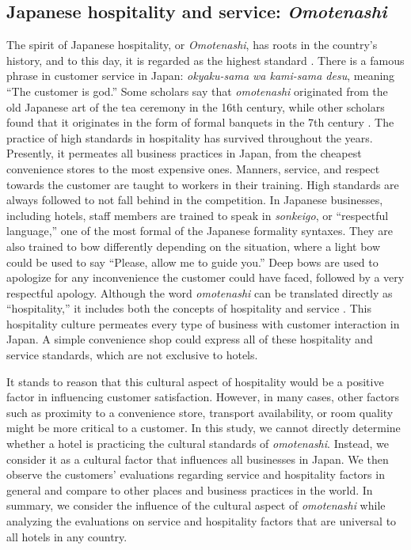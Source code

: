 \documentclass[smallextended,natbib]{svjour3}       %
\begin{document}
  \subsection{Japanese hospitality and service: \textit{Omotenashi}}\label{theory_omotenashi}

    The spirit of Japanese hospitality, or \textit{Omotenashi}, has roots in the country’s history, and to this day, it is regarded as the highest standard \cite[][]{ikeda2013omotenashi, al2015characteristics}. There is a famous phrase in customer service in Japan: \textit{okyaku-sama wa kami-sama desu}, meaning ``The customer is god.'' Some scholars say that \textit{omotenashi} originated from the old Japanese art of the tea ceremony in the 16th century, while other scholars found that it originates in the form of formal banquets in the 7th century \cite[][]{aishima2015origin}. The practice of high standards in hospitality has survived throughout the years. Presently, it permeates all business practices in Japan, from the cheapest convenience stores to the most expensive ones. Manners, service, and respect towards the customer are taught to workers in their training. High standards are always followed to not fall behind in the competition. In Japanese businesses, including hotels, staff members are trained to speak in \textit{sonkeigo}, or ``respectful language,'' one of the most formal of the Japanese formality syntaxes. They are also trained to bow differently depending on the situation, where a light bow could be used to say ``Please, allow me to guide you.'' Deep bows are used to apologize for any inconvenience the customer could have faced, followed by a very respectful apology. Although the word \textit{omotenashi} can be translated directly as ``hospitality,'' it includes both the concepts of hospitality and service \cite[][]{Kuboyama2020}. This hospitality culture permeates every type of business with customer interaction in Japan. A simple convenience shop could express all of these hospitality and service standards, which are not exclusive to hotels.  

    It stands to reason that this cultural aspect of hospitality would be a positive factor in influencing customer satisfaction. However, in many cases, other factors such as proximity to a convenience store, transport availability, or room quality might be more critical to a customer.  In this study, we cannot directly determine whether a hotel is practicing the cultural standards of \textit{omotenashi}. Instead, we consider it as a cultural factor that influences all businesses in Japan. We then observe the customers' evaluations regarding service and hospitality factors in general and compare to other places and business practices in the world. In summary, we consider the influence of the cultural aspect of \textit{omotenashi} while analyzing the evaluations on service and hospitality factors that are universal to all hotels in any country.
\end{document}
